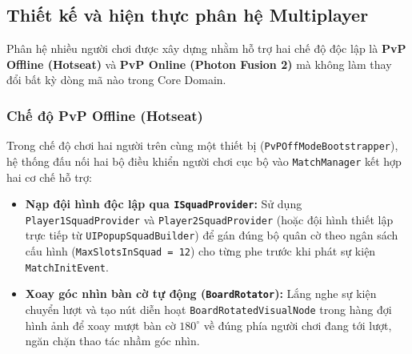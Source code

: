 \subsection{Thiết kế và hiện thực phân hệ Multiplayer}

Phân hệ nhiều người chơi được xây dựng nhằm hỗ trợ hai chế độ độc lập là \textbf{PvP Offline (Hotseat)} và \textbf{PvP Online (Photon Fusion 2)} mà không làm thay đổi bất kỳ dòng mã nào trong Core Domain.

\subsubsection{Chế độ PvP Offline (Hotseat)}
Trong chế độ chơi hai người trên cùng một thiết bị (\texttt{PvPOffModeBootstrapper}), hệ thống đấu nối hai bộ điều khiển người chơi cục bộ vào \texttt{MatchManager} kết hợp hai cơ chế hỗ trợ:
\begin{itemize}
    \item \textbf{Nạp đội hình độc lập qua \texttt{ISquadProvider}:} Sử dụng \texttt{Player1SquadProvider} và \texttt{Player2SquadProvider} (hoặc đội hình thiết lập trực tiếp từ \texttt{UIPopupSquadBuilder}) để gán đúng bộ quân cờ theo ngân sách cấu hình (\texttt{MaxSlotsInSquad = 12}) cho từng phe trước khi phát sự kiện \texttt{MatchInitEvent}.
    \item \textbf{Xoay góc nhìn bàn cờ tự động (\texttt{BoardRotator}):} Lắng nghe sự kiện chuyển lượt và tạo nút diễn hoạt \texttt{BoardRotatedVisualNode} trong hàng đợi hình ảnh để xoay mượt bàn cờ $180^\circ$ về đúng phía người chơi đang tới lượt, ngăn chặn thao tác nhầm góc nhìn.
\end{itemize}

